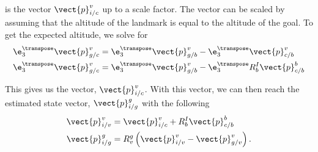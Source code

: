   is the vector $\vect{p}_{i/c}^v$ up to a scale factor. The vector can be scaled by assuming that the altitude of the landmark is equal to the
altitude of the goal. To get the expected altitude, we solve for
\begin{align}
  \e_3^\transpose \vect{p}_{g/c}^v &= \e_3^\transpose \vect{p}_{g/b}^v - \e_3^\transpose \vect{p}_{c/b}^v \\
  \e_3^\transpose \vect{p}_{g/c}^v &= \e_3^\transpose \vect{p}_{g/b}^v -
  \e_3^\transpose R_b^I \vect{p}_{c/b}^b
\end{align}

This gives us the vector, $\vect{p}_{i/c}^v$.
With this vector, we can then reach the estimated state vector,
$\vect{p}_{i/g}^g$ with the following
\begin{align}
  \vect{p}_{i/v}^v &= \vect{p}_{i/c}^v + R_b^I \vect{p}_{c/b}^b \\
  \vect{p}_{i/g}^g &= R_v^g \left( \vect{p}_{i/v}^v - \vect{p}_{g/v}^v \right).
\end{align}

